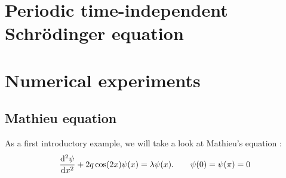 %
%

\cite{baeyens_fast_2020}

\section{Periodic \texorpdfstring{\oneD}{1D} time-independent Schrödinger equation}
\label{sec:1d_periodic}

\begin{theorem}

\end{theorem}
\cite{binding_prufer_2012}


\section{Numerical experiments}\label{sec:c2_numerical_experiments}

\subsection{Mathieu equation}\label{mathieu-equation}

As a first introductory example, we will take a look at Mathieu's
equation \cite{pryce_sltstpak_1999}: \begin{equation}
    \dv[2]{\psi}{x} + 2q\cos(2x)\psi(x) = \lambda\psi(x) \text{.}  \qquad \psi(0) = \psi(\pi) = 0
    \label{mathieu}
\end{equation}


